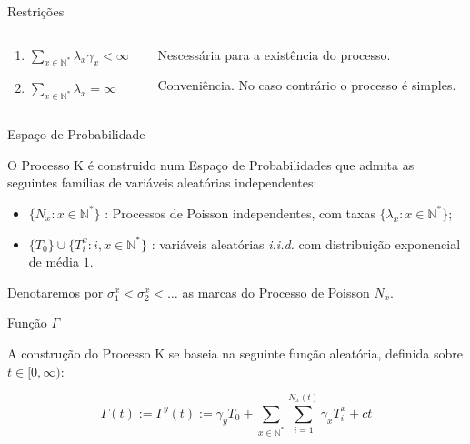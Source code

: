 \documentclass[xcolor=pdftex,dvipsnames]{beamer}
\newcommand{\Nz}{{\mathbb{N^*}}}
\begin{document}
\begin{frame}{Restrições}

  \begin{columns}
    \begin{column}{0.3\textwidth}
      \begin{enumerate}
      \item $ \displaystyle \sum_{x\in \Nz} \lambda_x \gamma_x <
        \infty $    
        \bigskip
      \item $ \displaystyle \sum_{x\in \Nz} \lambda_x = \infty $
      \end{enumerate}

    \end{column}
    
    \begin{column}{0.7\textwidth}
  
      Nescessária para a existência do processo.
      
      Conveniência. No caso contrário o processo é simples.
      
    \end{column}
  \end{columns}
  
  
\end{frame}

\begin{frame}{Espaço de Probabilidade}

  O Processo K é construido num Espaço de Probabilidades que admita as
  seguintes famílias de variáveis aleatórias independentes:

  \begin{itemize}
  \item $\{ N_x: x \in \Nz\}$ : Processos de Poisson independentes,
    com taxas $\{ \lambda_x : x \in \Nz \}$;
  \item $\{T_0\} \cup \{ T_i^x: i, x \in \Nz  \}$ : variáveis aleatórias
    \emph{i.i.d.} com distribuição exponencial de média $1$.
  \end{itemize}

  Denotaremos por $\sigma^x_1 < \sigma^x_2 < \ldots$ as marcas do
  Processo de Poisson $N_x$.
  
\end{frame}

\begin{frame}{Função $\Gamma$}

  A construção do Processo K se baseia na seguinte função aleatória,
  definida sobre $t \in [0, \infty)$:

  \begin{displaymath}
    \Gamma(t) := \Gamma^y(t) := \gamma_y T_0 + \sum_{x \in \Nz} \sum_{i = 1}^{N_x (t)}
    \gamma_x T^x_i + c t
  \end{displaymath}
\end{frame}
\end{document}
